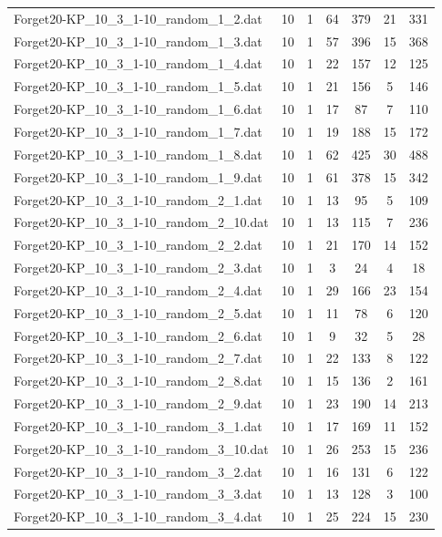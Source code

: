\begin{table}[!ht]
\begin{tabular}{lcccccc}
Forget20-KP\_10\_3\_1-10\_random\_1\_2.dat & 10 & 1 & 64 & 379 & 21 & 331 \\
Forget20-KP\_10\_3\_1-10\_random\_1\_3.dat & 10 & 1 & 57 & 396 & 15 & 368 \\
Forget20-KP\_10\_3\_1-10\_random\_1\_4.dat & 10 & 1 & 22 & 157 & 12 & 125 \\
Forget20-KP\_10\_3\_1-10\_random\_1\_5.dat & 10 & 1 & 21 & 156 & 5 & 146 \\
Forget20-KP\_10\_3\_1-10\_random\_1\_6.dat & 10 & 1 & 17 & 87 & 7 & 110 \\
Forget20-KP\_10\_3\_1-10\_random\_1\_7.dat & 10 & 1 & 19 & 188 & 15 & 172 \\
Forget20-KP\_10\_3\_1-10\_random\_1\_8.dat & 10 & 1 & 62 & 425 & 30 & 488 \\
Forget20-KP\_10\_3\_1-10\_random\_1\_9.dat & 10 & 1 & 61 & 378 & 15 & 342 \\
Forget20-KP\_10\_3\_1-10\_random\_2\_1.dat & 10 & 1 & 13 & 95 & 5 & 109 \\
Forget20-KP\_10\_3\_1-10\_random\_2\_10.dat & 10 & 1 & 13 & 115 & 7 & 236 \\
Forget20-KP\_10\_3\_1-10\_random\_2\_2.dat & 10 & 1 & 21 & 170 & 14 & 152 \\
Forget20-KP\_10\_3\_1-10\_random\_2\_3.dat & 10 & 1 & 3 & 24 & 4 & 18 \\
Forget20-KP\_10\_3\_1-10\_random\_2\_4.dat & 10 & 1 & 29 & 166 & 23 & 154 \\
Forget20-KP\_10\_3\_1-10\_random\_2\_5.dat & 10 & 1 & 11 & 78 & 6 & 120 \\
Forget20-KP\_10\_3\_1-10\_random\_2\_6.dat & 10 & 1 & 9 & 32 & 5 & 28 \\
Forget20-KP\_10\_3\_1-10\_random\_2\_7.dat & 10 & 1 & 22 & 133 & 8 & 122 \\
Forget20-KP\_10\_3\_1-10\_random\_2\_8.dat & 10 & 1 & 15 & 136 & 2 & 161 \\
Forget20-KP\_10\_3\_1-10\_random\_2\_9.dat & 10 & 1 & 23 & 190 & 14 & 213 \\
Forget20-KP\_10\_3\_1-10\_random\_3\_1.dat & 10 & 1 & 17 & 169 & 11 & 152 \\
Forget20-KP\_10\_3\_1-10\_random\_3\_10.dat & 10 & 1 & 26 & 253 & 15 & 236 \\
Forget20-KP\_10\_3\_1-10\_random\_3\_2.dat & 10 & 1 & 16 & 131 & 6 & 122 \\
Forget20-KP\_10\_3\_1-10\_random\_3\_3.dat & 10 & 1 & 13 & 128 & 3 & 100 \\
Forget20-KP\_10\_3\_1-10\_random\_3\_4.dat & 10 & 1 & 25 & 224 & 15 & 230 \\

\end{tabular}
\end{table}
